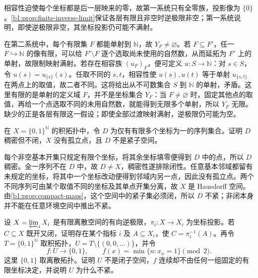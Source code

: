 \begin{solution}
	相容性迫使每个坐标都是后一层映来的零，故第一系统只有全零族，投影像为 \(\{0\}\)。\cref{b1:prop:finite-inverse-limit}保证各层有限且非空时逆极限非空；第一系统说明，即使逆极限非空，其坐标投影仍可能不满射。

	在第二系统中，每个有限集 \(F\) 都能单射到 \(\mathbb N\)，故 \(Y_F\neq\varnothing\)。若 \(F\subseteq F'\)，任一 \(F\hookrightarrow\mathbb N\) 的像有限，可以给 \(F'\setminus F\) 逐个选取尚未使用的自然数，从而延拓为 \(F'\) 上的单射，故限制映射满射。若存在相容族 \((u_F)_F\)，便可定义 \(u:S\to\mathbb N\)：对 \(s\in S\)，令 \(u(s)=u_{\{s\}}(s)\)。任取不同的 \(s,t\)，相容性使 \(u(s),u(t)\) 等于单射 \(u_{\{s,t\}}\) 在两点上的取值，故二者不同。这将给出从不可数集合 \(S\) 到 \(\mathbb N\) 的单射，矛盾。这里有限的是单射的定义域 \(F\)，并不是坐标集合 \(Y_F\)：当 \(F\neq\varnothing\) 时，固定其他点的取值，再给一个点选取不同的未用自然数，就能得到无限多个单射，所以 \(Y_F\) 无限。缺少的正是各层有限这一假设；即使全部过渡映射满射，逆极限仍可能为空。
\end{solution}

\begin{exercise}\label{b1:ex:A-08}
	在 \(X=\{0,1\}^{\mathbb N}\) 的积拓扑中，令 \(D\) 为仅有有限多个坐标为一的序列集合。证明 \(D\) 稠密但不闭，\(X\) 没有孤立点，且 \(D\) 不是紧子空间。
\end{exercise}

\begin{solution}
	每个非空基本开集只规定有限个坐标，将其余坐标填零便得到 \(D\) 中的点，所以 \(D\) 稠密。全一序列不在 \(D\) 中，故 \(D\ne X\)，稠密性遂排除闭性。任意基本邻域都留有未规定的坐标，将其中一个坐标改动便得到邻域内另一点，因此没有孤立点。两个不同序列可由某个取值不同的坐标及其单点开集分离，故 \(X\) 是 Hausdorff 空间。由\cref{b1:prop:compact-maps}，这个空间中的紧子集必须闭，所以 \(D\) 不紧；非闭本身并不能在任意环境空间中推出不紧。
\end{solution}

\begin{exercise}\label{b1:ex:A-09}
	设 \(X=\varprojlim_iX_i\) 是有限离散空间的有向逆极限，\(\pi_i:X\to X_i\) 为坐标投影。若 \(C\subseteq X\) 既开又闭，证明存在某个指标 \(i\) 及 \(A\subseteq X_i\)，使 \(C=\pi_i^{-1}(A)\)。再令 \(T=\{0,1\}^{\mathbb N}\) 取积拓扑，\(U=T\setminus\{(0,0,\ldots)\}\)，并令
	\[
		f:U\longrightarrow\{0,1\},\qquad f(x)=\min\{n:x_n=1\}\pmod 2.
	\]
	这里 \(\{0,1\}\) 取离散拓扑。证明 \(U\) 不是闭子空间，\(f\) 连续却不由任何一组固定的有限坐标决定，并说明 \(U\) 为什么不紧。
\end{exercise}

